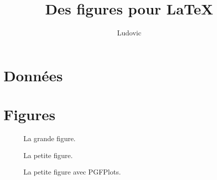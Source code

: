 \documentclass[12pt,a4paper,twoside,twocolumn]{article}
\author{Ludovic}
\title{Des figures pour \LaTeX}
\begin{document}
\maketitle


\section{Données}

\section{Figures}
\blindtext[10]

\begin{figure} %
  \begin{center}
    \caption{La grande figure.}
  \end{center}
\end{figure}

\begin{figure} %
  \begin{center}
    \caption{La petite figure.}
  \end{center}
\end{figure}



\begin{figure}

\caption{La petite figure avec PGFPlots.}
\end{figure}

\blindtext[10]
\end{document}
